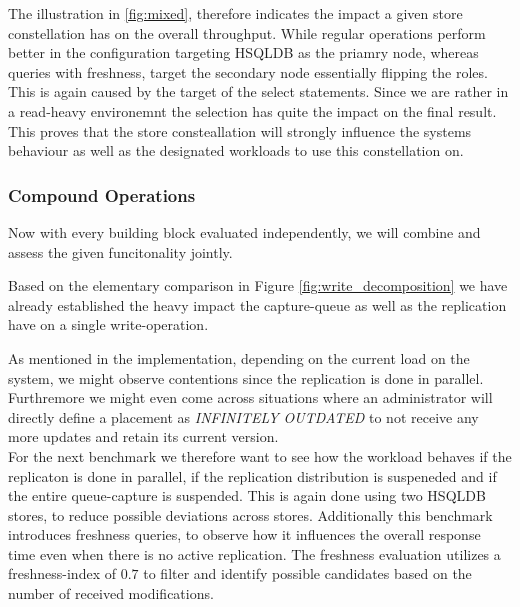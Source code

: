 The illustration in \ref{fig:mixed}, therefore indicates the impact a given store constellation has on the overall throughput.
While regular operations perform better in the configuration targeting HSQLDB as the priamry node,
whereas queries with freshness, target the secondary node essentially flipping the roles.
This is again caused by the target of the select statements. 
Since we are rather in a read-heavy environemnt the selection has quite the impact on the final result.
This proves that the store consteallation will strongly influence the systems behaviour as well as the designated workloads to use this constellation on.


\subsubsection{Compound Operations} 

Now with every building block evaluated independently, we will combine and assess the given funcitonality jointly.



Based on the elementary comparison in Figure \ref{fig:write_decomposition} we have already established the heavy impact the capture-queue as well as the 
replication have on a single write-operation.

As mentioned in the implementation, depending on the current load on the system, we might observe contentions since the replication is done in parallel.
Furthremore we might even come across situations where an administrator will directly define a placement as \emph{INFINITELY OUTDATED} to not receive any more updates
and retain its current version.\\
For the next benchmark we therefore want to see how the workload behaves if the replicaton is done in parallel, if the replication distribution is suspeneded
and if the entire queue-capture is suspended.
This is again done using two HSQLDB stores, to reduce possible deviations across stores. 
Additionally this benchmark introduces freshness queries, to observe how it influences the overall response time even when there is no active replication. 
The freshness evaluation utilizes a freshness-index of $0.7$ to filter and identify possible candidates based on the number of received modifications.


